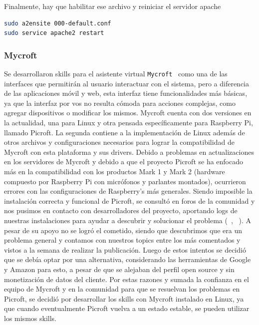 Finalmente, hay que habilitar ese archivo y reiniciar el servidor apache 

\begin{lstlisting}[language=bash]
sudo a2ensite 000-default.conf
sudo service apache2 restart
\end{lstlisting}



\subsubsection{Mycroft}

Se desarrollaron skills para el asistente virtual \lstinline[columns=fixed]{Mycroft}~\cite{Mycroft} como una de las interfaces que permitirán al usuario interactuar con el sistema, pero a diferencia de las aplicaciones móvil y web, esta interfaz tiene funcionalidades más básicas, ya que la interfaz por vos no resulta cómoda para acciones complejas, como agregar dispositivos o modificar los mismos.
Mycroft cuenta con dos versiones en la actualidad, una para Linux y otra pensada específicamente para Raspberry Pi, llamado Picroft. La segunda contiene a la implementación de Linux además de otros archivos y configuraciones necesarios para lograr la compatibilidad de Mycroft con esta plataforma y sus drivers.
Debido a problemas en actualizaciones en los servidores de Mycroft y debido a que el proyecto Picroft se ha enfocado más en la compatibilidad con los productos Mark 1 y Mark 2 (hardware compuesto por Raspberry Pi con micrófonos y parlantes montados), ocurrieron errores con las configuraciones de Raspberry's más generales.
Siendo imposible la instalación correcta y funcional de Picroft, se consultó en foros de la comunidad y nos pusimos en contacto con desarrolladores del proyecto, aportando logs de nuestras instalaciones para ayudar a descubrir y solucionar el problema (~\cite{Topic1}, ~\cite{Topic2}).
A pesar de su apoyo no se logró el cometido, siendo que descubrimos que era un problema general y contamos con nuestros topics entre los más comentados y vistos a la semana de realizar la publicación.
Luego de estos intentos se decidió que se debía optar por una alternativa, considerando las herramientas de Google y Amazon para esto, a pesar de que se alejaban del perfil open source y sin monetización de datos del cliente. Por estas razones y sumada la confianza en el equipo de Mycroft y en la comunidad para que se resuelvan los problemas en Picroft, se decidió por desarrollar los skills con Mycroft instalado en Linux, ya que cuando eventualmente Picroft vuelva a un estado estable, se pueden utilizar los mismos skills.

